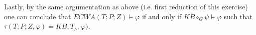 \documentclass[11pt,a4paper]{article}
\newcommand{\nmodels}{\not\models}
\begin{document}
\begin{enumerate}
\begin{itemize}
Lastly, by the same argumentation as above (i.e. first reduction of this exercise) one can conclude that $ \mathit{ECWA}(T;P;Z) \models \varphi $ if and only if  $\mathit{KB} \circ_G \psi \models \varphi  $ such that $\tau(T;P;Z, \varphi) =  \mathit{KB}, T_{\land}, \varphi) $.

%
%
%
%
%
%
%
%




%
%
%


\end{itemize}
\end{enumerate}
\end{document}
